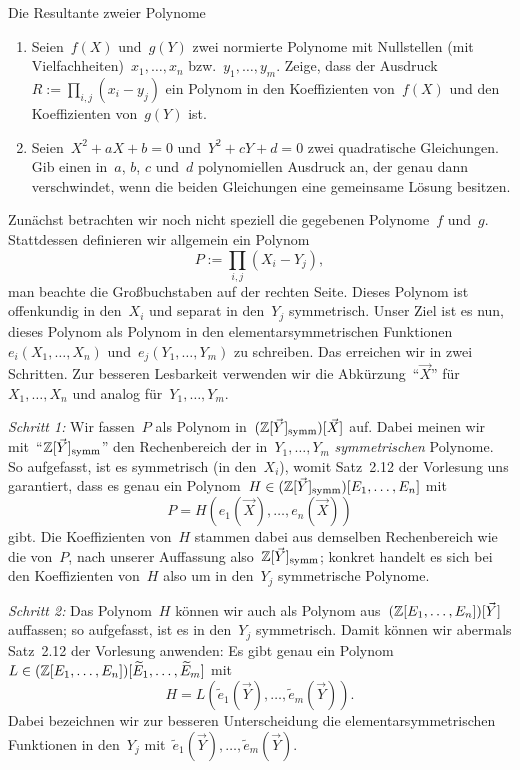 \documentclass{algblatt}
\begin{document}
\begin{aufgabe}{Die Resultante zweier Polynome}
\begin{enumerate}
\item Seien~$f(X)$ und~$g(Y)$ zwei normierte Polynome mit Nullstellen (mit
Vielfachheiten)~$x_1,\ldots,x_n$ bzw.~$y_1,\ldots,y_m$. Zeige, dass der
Ausdruck~$R := \prod_{i,j} (x_i - y_j)$ ein Polynom in den
Koeffizienten von~$f(X)$ und den
Koeffizienten von~$g(Y)$ ist.
\item Seien~$X^2 + aX + b = 0$ und~$Y^2 + cY + d = 0$ zwei quadratische
Gleichungen. Gib einen in~$a$, $b$, $c$ und~$d$ polynomiellen Ausdruck an, der
genau dann verschwindet, wenn die beiden Gleichungen eine gemeinsame Lösung
besitzen.
\end{enumerate}

\begin{loesungE}
\item Zunächst betrachten wir noch nicht speziell die gegebenen
Polynome~$f$ und~$g$. Stattdessen definieren wir allgemein ein Polynom
\[ P := \prod_{i,j} (X_i - Y_j), \]
man beachte die Großbuchstaben auf der rechten Seite. Dieses Polynom ist
offenkundig in den~$X_i$ und separat in den~$Y_j$ symmetrisch. Unser Ziel ist
es nun, dieses Polynom als Polynom in den elementarsymmetrischen
Funktionen~$e_i(X_1,\ldots,X_n)$ und~$e_j(Y_1,\ldots,Y_m)$ zu schreiben. Das
erreichen wir in zwei Schritten. Zur besseren Lesbarkeit verwenden wir die
Abkürzung~"`$\vec X$"' für~$X_1,\ldots,X_n$ und analog für~$Y_1,\ldots,Y_m$.

\newcommand{\symm}{\mathrm{symm}}%
\emph{Schritt 1:} Wir fassen~$P$ als Polynom
in~$(\ZZ[\vec Y]_\symm)[\vec X]$ auf. Dabei meinen wir mit~"`$\ZZ[\vec
Y]_\symm$"' den Rechenbereich der in~$Y_1,\ldots,Y_m$ \emph{symmetrischen}
Polynome. So aufgefasst, ist es symmetrisch (in den~$X_i$), womit Satz~2.12 der
Vorlesung uns garantiert, dass es genau ein Polynom~$H \in (\ZZ[\vec
Y]_\symm)[E_1,\ldots,E_n]$ mit
\[ P = H(e_1(\vec X), \ldots, e_n(\vec X)) \]
gibt. Die Koeffizienten von~$H$ stammen dabei aus demselben Rechenbereich wie
die von~$P$, nach unserer Auffassung also~$\ZZ[\vec Y]_\symm$; konkret handelt
es sich bei den Koeffizienten von~$H$ also um in den~$Y_j$ symmetrische
Polynome.

\emph{Schritt 2:} Das Polynom~$H$ können wir auch als Polynom
aus~$(\mathbb{Z}[E_1,\ldots,E_n])[\vec Y]$ auffassen; so aufgefasst, ist es in
den~$Y_j$ symmetrisch. Damit können wir abermals Satz~2.12 der Vorlesung
anwenden: Es gibt genau ein Polynom~$L \in
(\mathbb{Z}[E_1,\ldots,E_n])[\widetilde E_1,\ldots,\widetilde E_m]$ mit
\[ H = L(\widetilde e_1(\vec Y), \ldots, \widetilde e_m(\vec Y)). \]
Dabei bezeichnen wir zur besseren Unterscheidung die elementarsymmetrischen
Funktionen in den~$Y_j$ mit~$\widetilde e_1(\vec Y), \ldots, \widetilde e_m(\vec Y)$.


\end{loesungE}
\end{aufgabe}
\end{document}
